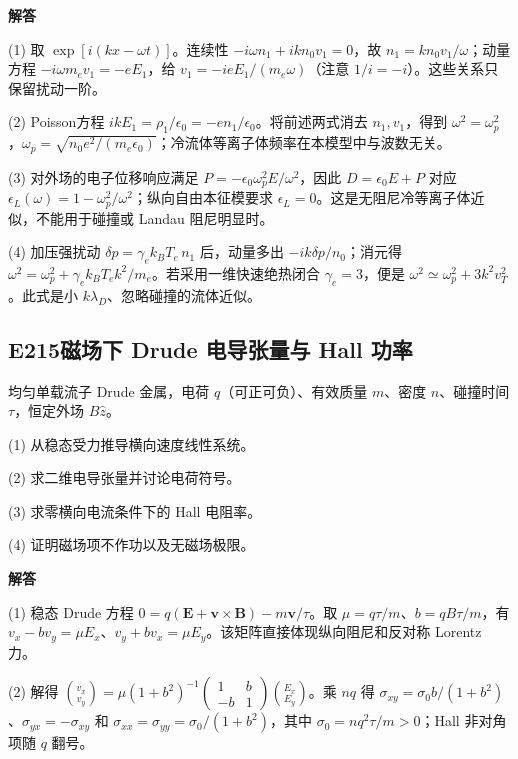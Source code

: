 \par\textbf{解答}

(1) 取 $\exp[i(kx-\omega t)]$。连续性 $-i\omega n_1+ikn_0v_1=0$，故 $n_1=kn_0v_1/\omega$；动量方程 $-i\omega m_ev_1=-eE_1$，给 $v_1=-i eE_1/(m_e\omega)$（注意 $1/i=-i$）。这些关系只保留扰动一阶。

(2) Poisson方程 $ikE_1=\rho_1/\epsilon_0=-en_1/\epsilon_0$。将前述两式消去 $n_1,v_1$，得到 $\omega^2=\omega_p^2$，$\omega_p=\sqrt{n_0e^2/(m_e\epsilon_0)}$；冷流体等离子体频率在本模型中与波数无关。

(3) 对外场的电子位移响应满足 $P=-\epsilon_0\omega_p^2E/\omega^2$，因此 $D=\epsilon_0E+P$ 对应 $\epsilon_L(\omega)=1-\omega_p^2/\omega^2$；纵向自由本征模要求 $\epsilon_L=0$。这是无阻尼冷等离子体近似，不能用于碰撞或 Landau 阻尼明显时。

(4) 加压强扰动 $\delta p=\gamma_e k_BT_e\,n_1$ 后，动量多出 $-ik\delta p/n_0$；消元得 $\omega^2=\omega_p^2+\gamma_e k_BT_e k^2/m_e$。若采用一维快速绝热闭合 $\gamma_e=3$，便是 $\omega^2\simeq\omega_p^2+3k^2v_T^2$。此式是小 $k\lambda_D$、忽略碰撞的流体近似。

\par\medskip

\subsection*{E215\quad 磁场下 Drude 电导张量与 Hall 功率}

均匀单载流子 Drude 金属，电荷 $q$（可正可负）、有效质量 $m$、密度 $n$、碰撞时间 $\tau$，恒定外场 $B\hat z$。

(1) 从稳态受力推导横向速度线性系统。

(2) 求二维电导张量并讨论电荷符号。

(3) 求零横向电流条件下的 Hall 电阻率。

(4) 证明磁场项不作功以及无磁场极限。

\par\textbf{解答}

(1) 稳态 Drude 方程 $0=q(\mathbf E+\mathbf v\times\mathbf B)-m\mathbf v/\tau$。取 $\mu=q\tau/m$、$b=qB\tau/m$，有 $v_x-bv_y=\mu E_x$、$v_y+bv_x=\mu E_y$。该矩阵直接体现纵向阻尼和反对称 Lorentz 力。

(2) 解得 $\binom{v_x}{v_y}=\mu(1+b^2)^{-1}\begin{pmatrix}1&b\\-b&1\end{pmatrix}\binom{E_x}{E_y}$。乘 $nq$ 得 $\sigma_{xy}=\sigma_0b/(1+b^2)$、$\sigma_{yx}=-\sigma_{xy}$ 和 $\sigma_{xx}=\sigma_{yy}=\sigma_0/(1+b^2)$，其中 $\sigma_0=nq^2\tau/m>0$；Hall 非对角项随 $q$ 翻号。

